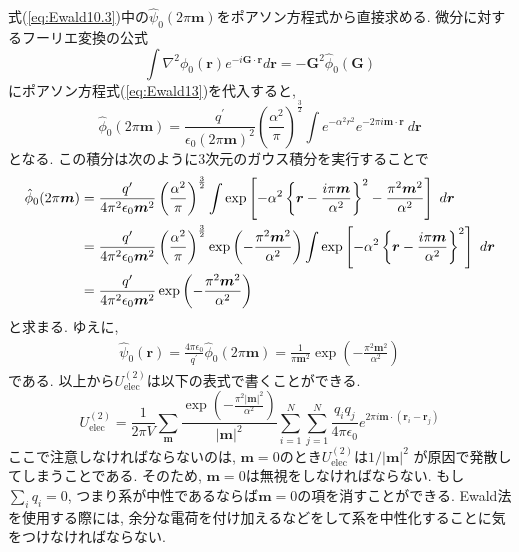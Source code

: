 式(\ref{eq:Ewald10.3})中の$\hat{\psi}_{0}(2 \pi \bm{m})$をポアソン方程式から直接求める.
微分に対するフーリエ変換の公式
\begin{equation}
    \int \nabla^{2} \phi_{0} (\bm{r}) e^{- i \bm{G} \cdot \bm{r}} d \bm{r}
  =
    -\bm{G}^{2} \hat{\phi}_{0}(\bm{G})
 \label{eq:Ewald28}
\end{equation}
にポアソン方程式(\ref{eq:Ewald13})を代入すると,
\begin{equation}
    \hat{\phi}_{0}(2 \pi \bm{m})
  =
    \frac{q^{\prime}}{\epsilon_{0} (2 \pi \bm{m})^{2}}
    \left( \frac{\alpha^{2}}{\pi} \right)^{\frac{3}{2}}
    \int e^{- \alpha^{2} r^{2}} e^{-2 \pi i \bm{m} \cdot \bm{r}} ~d\bm{r}
 \label{eq:Ewald29}
\end{equation}
となる. この積分は次のように3次元のガウス積分を実行することで
\begin{align}
    \hat{\phi}_{0}(2 \pi \bm{m})
 &=
    \frac{q^{\prime}}{4 \pi^{2} \epsilon_{0} \bm{m}^{2}}
    \left( \frac{\alpha^{2}}{\pi} \right)^{\frac{3}{2}}
    \int \exp
    \left[
          -\alpha^{2} \left\{ \bm{r} - \frac{i \pi \bm{m}}{\alpha^{2}} \right\}^{2}
          - \frac{\pi^{2}\bm{m}^{2}}{\alpha^{2}}
    \right] ~d \bm{r}
 \notag
 \\
 &=
    \frac{q^{\prime}}{4 \pi^{2} \epsilon_{0} \bm{m}^{2}}
    \left( \frac{\alpha^{2}}{\pi} \right)^{\frac{3}{2}}
    \exp\left( -\frac{\pi^{2}\bm{m}^{2}}{\alpha^{2}} \right)
    \int \exp
    \left[
          -\alpha^{2} \left\{ \bm{r} - \frac{i \pi \bm{m}}{\alpha^{2}} \right\}^{2}
    \right] ~d \bm{r}
 \notag
 \\
 &=
    \frac{q^{\prime}}{4 \pi ^{2} \epsilon_{0} \bm{m}^{2}}
    \exp\left( -\frac{\pi^{2}\bm{m}^{2}}{\alpha^{2}} \right)
 \label{eq:Ewald30}
\end{align}
と求まる. ゆえに,
\begin{align}
   \hat{\psi}_{0} ( \bm{r} )
 =
   \frac{4 \pi \epsilon_{0}}{q^{\prime}}  \hat{\phi}_{0} ( 2 \pi \bm{m} )
 =
   \frac{1}{\pi \bm{m}^{2}}
   \exp\left(-\frac{\pi^{2}\bm{m}^{2}}{\alpha^{2}}\right)
 \label{eq:Ewald31}
\end{align}
である. 以上から$U_{\mathrm{elec}}^{(2)}$は以下の表式で書くことができる.
\begin{equation}
    U_{\mathrm{elec}}^{(2)}
  =
    \frac{1}{2 \pi V } \sum_{\bm{m}}
    \frac{\exp( -\frac{\pi^{2} |\bm{m}|^{2}}{\alpha^{2}})}{|\bm{m}|^{2}}
    \sum_{i=1}^{N} \sum_{j=1}^{N}
    \frac{q_{i}q_{j} }{4 \pi \epsilon_{0}}
    e^{2 \pi i \bm{m} \cdot (\bm{r}_{i} - \bm{r}_{j})}
 \label{eq:Ewald32}
\end{equation}
ここで注意しなければならないのは, $\bm{m}=0$のとき$U_{\mathrm{elec}}^{(2)}$は$1/|\bm{m}|^{2}$
が原因で発散してしまうことである. そのため, $\bm{m}=0$は無視をしなければならない.
もし$\sum_{i}q_{i}=0$, つまり系が中性であるならば$\bm{m}=0$の項を消すことができる.
Ewald法を使用する際には, 余分な電荷を付け加えるなどをして系を中性化することに気をつけなければならない.

